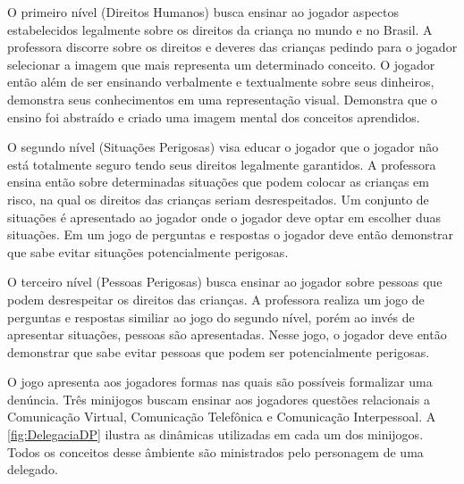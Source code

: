 O primeiro nível (Direitos Humanos) busca ensinar ao jogador aspectos estabelecidos legalmente sobre os direitos da criança no mundo e no Brasil. A professora discorre sobre os direitos e deveres das crianças pedindo para o jogador selecionar a imagem que mais representa um determinado conceito. O jogador então além de ser ensinando verbalmente e textualmente sobre seus dinheiros, demonstra seus conhecimentos em uma representação visual. Demonstra que o ensino foi abstraído e criado uma imagem mental dos conceitos aprendidos. 

O segundo nível (Situações Perigosas) visa educar o jogador que o jogador não está totalmente seguro tendo seus direitos legalmente garantidos. A professora ensina então sobre determinadas situações que podem colocar as crianças em risco, na qual os direitos das crianças seriam desrespeitados. Um conjunto de situações é apresentado ao jogador onde o jogador deve optar em escolher duas situações. Em um jogo de perguntas e respostas o jogador deve então demonstrar que sabe evitar situações potencialmente perigosas.

O terceiro nível (Pessoas Perigosas) busca ensinar ao jogador sobre pessoas que podem desrespeitar os direitos das crianças. A professora realiza um jogo de perguntas e respostas similiar ao jogo do segundo nível, porém ao invés de apresentar situações, pessoas são apresentadas. Nesse jogo, o jogador deve então demonstrar que sabe evitar pessoas que podem ser potencialmente perigosas.


O jogo apresenta aos jogadores formas nas quais são possíveis formalizar uma denúncia. Três minijogos buscam ensinar aos jogadores questões relacionais a Comunicação Virtual, Comunicação Telefônica e Comunicação Interpessoal. A \autoref{fig:DelegaciaDP} ilustra as dinâmicas utilizadas em cada um dos minijogos. Todos os conceitos desse âmbiente são ministrados pelo personagem de uma delegado. 

